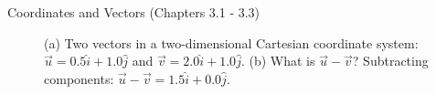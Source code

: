 \documentclass{beamer}
\begin{document}
\begin{frame}{Coordinates and Vectors (Chapters 3.1 - 3.3)}
\begin{figure}
\centering
{}
\caption{\label{fig:twovectors2} (a) Two vectors in a two-dimensional Cartesian coordinate system: $\vec{u} = 0.5\hat{i}+1.0\hat{j}$ and $\vec{v} = 2.0\hat{i}+1.0\hat{j}$.  (b) What is $\vec{u}-\vec{v}$?  Subtracting components: $\vec{u}-\vec{v} = 1.5\hat{i}+0.0\hat{j}$.}
\end{figure}
\end{frame}
\end{document}
